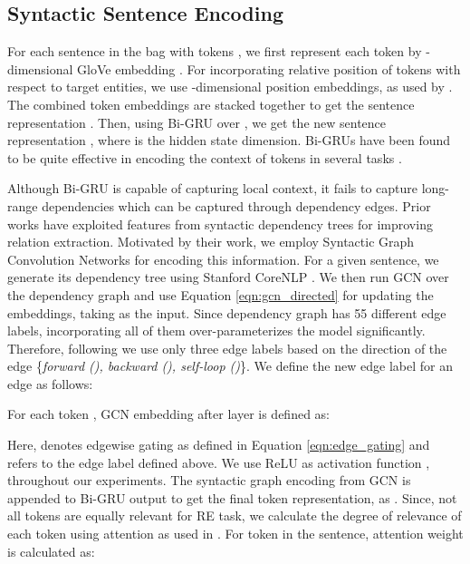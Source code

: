 \documentclass[11pt,a4paper]{article}
\newcommand{\refeqn}[1]{Equation \ref{#1}}
\newcommand{\lstm}{GRU}
\newcommand{\stepOne}{Syntactic Sentence Encoding}
\begin{document}
\subsection{\stepOne{}}
\label{sec:sent_encoder}
For each sentence in the bag  with  tokens , we first represent each token by -dimensional GloVe embedding \cite{pennington2014glove}. For incorporating relative position of tokens with respect to target entities, we use -dimensional position embeddings, as used by \cite{zeng2014relation}. The combined token embeddings are stacked together to get the sentence representation . Then, using Bi-\lstm{} \cite{gru_paper} over , we get the new sentence representation , where  is the hidden state dimension. Bi-\lstm{}s have been found to be quite effective in encoding the context of tokens in several tasks \cite{Sutskever:2014:SSL:2969033.2969173,rnn_speech_recog}.

Although Bi-\lstm{} is capable of capturing local context, it fails to capture long-range dependencies which can be captured through dependency edges. Prior works \cite{mintz2009distant,see_paper} have exploited features from syntactic dependency trees for improving relation extraction. Motivated by their work, we employ Syntactic Graph Convolution Networks for encoding this information. For a given sentence, we generate its dependency tree using Stanford CoreNLP \cite{stanford_corenlp}. We then run GCN over the dependency graph and use \refeqn{eqn:gcn_directed} for updating the embeddings, taking  as the input. Since dependency graph has 55 different edge labels, incorporating all of them over-parameterizes the model significantly. Therefore, following \cite{gcn_srl,gcn_event,neuraldater_paper} we use only three edge labels based on the direction of the edge \{\textit{forward (), backward (), self-loop ()}\}. We define the new edge label  for an edge  as follows:



For each token , GCN embedding  after  layer is defined as:

Here,  denotes edgewise gating as defined in \refeqn{eqn:edge_gating} and  refers to the edge label defined above. We use ReLU as activation function , throughout our experiments. The syntactic graph encoding from GCN is appended to Bi-\lstm{} output to get the final token representation,  as .
Since, not all tokens are equally relevant for RE task, we calculate the degree of relevance of each token using attention as used in \cite{bgwa_paper}. For token  in the sentence, attention weight  is calculated as:
\end{document}
